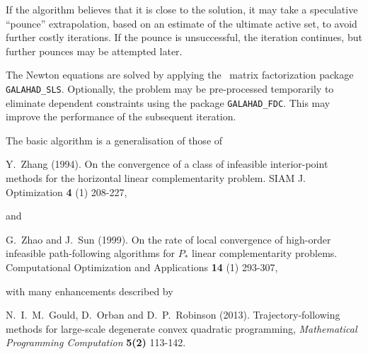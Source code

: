 \documentclass{galahad}
\begin{document}
If the algorithm believes that it is close to the solution, it may take a
speculative ``pounce'' extrapolation, based on an estimate of the ultimate 
active set, to avoid further costly iterations. If the pounce is unsuccessful, 
the iteration continues, but further pounces may be attempted later.

The Newton equations are solved  by applying the
\galahad\ matrix factorization package
{\tt GALAHAD\_SLS}.
Optionally, the problem may be pre-processed temporarily to eliminate dependent
constraints using the package {\tt GALAHAD\_FDC}. This may improve the
performance of the subsequent iteration.

\vspace*{1mm}

\galreferences
\vspace*{1mm}

\noindent
The basic algorithm is a generalisation of those of
\vspace*{1mm}

\noindent
Y.\ Zhang (1994).
On the convergence of a class of infeasible interior-point methods for the
horizontal linear complementarity problem.
SIAM J. Optimization {\bf 4} (1) 208-227,
\vspace*{1mm}

\noindent
and

\noindent
G.\ Zhao and J.\ Sun (1999).
On the rate of local convergence of high-order
infeasible path-following algorithms for $P_*$ linear complementarity
problems.
Computational Optimization and Applications {\bf 14} (1) 293-307,
\vspace*{1mm}

\noindent
with many enhancements described by
\vspace*{1mm}

\noindent
N.\ I.\ M.\ Gould, D.\ Orban and D.\ P.\ Robinson (2013).
Trajectory-following methods for
large-scale  degenerate convex quadratic programming,
{\em Mathematical Programming Computation} {\bf 5(2)} 113-142.

\end{document}

